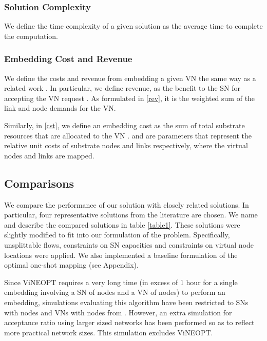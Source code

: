 \documentclass[journal]{IEEEtran}
\begin{document}
\subsubsection{Solution Complexity} We define the time complexity of a given solution as the average time to complete the computation.
\subsubsection{Embedding Cost and Revenue}
We define the costs and revenue from embedding a given \ac{VN} the same way as a related work \cite{Chowdhury12}. In particular, we define revenue,  as the benefit to the \ac{SN} for accepting the VN request . As formulated in \eqref{rev}, it is the weighted sum of the link and node demands for the \ac{VN}.
 

Similarly, in \eqref{cst}, we define an embedding cost  as the sum of total substrate resources that are allocated to the \ac{VN} .  and  are parameters that represent the relative unit costs of substrate nodes and links respectively, where the virtual nodes and links are mapped.
 
 
\subsection{Comparisons}

We compare the performance of our solution with closely related solutions. In particular, four representative solutions from the literature are chosen. We name and describe the compared solutions in table \ref{table1}. These solutions were slightly modified to fit into our formulation of the problem. Specifically, unsplittable flows, constraints on \ac{SN} capacities and constraints on virtual node locations were applied. We also implemented a baseline formulation of the optimal one-shot mapping (see Appendix). 

Since ViNEOPT requires a very long time (in excess of 1 hour for a single embedding involving a \ac{SN} of  nodes and a \ac{VN} of  nodes) to perform an embedding, simulations evaluating this algorithm have been restricted to \ac{SN}s with  nodes and \acp{VN} with nodes from . However, an extra simulation for acceptance ratio using larger sized networks has been performed so as to reflect more practical network sizes. This simulation excludes ViNEOPT.
\end{document}
